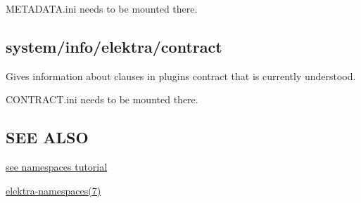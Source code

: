 {\ttfamily M\+E\+T\+A\+D\+A\+T\+A.\+ini} needs to be mounted there.\hypertarget{doc_help_elektra-hierarchy_md_autotoc_md1703}{}\subsection{system/info/elektra/contract}\label{doc_help_elektra-hierarchy_md_autotoc_md1703}
Gives information about clauses in plugin\textquotesingle{}s contract that is currently understood.

{\ttfamily C\+O\+N\+T\+R\+A\+C\+T.\+ini} needs to be mounted there.\hypertarget{doc_help_elektra-hierarchy_md_autotoc_md1704}{}\subsection{S\+E\+E A\+L\+SO}\label{doc_help_elektra-hierarchy_md_autotoc_md1704}

\begin{DoxyItemize}
\item \hyperlink{doc_tutorials_namespaces_md}{see namespaces tutorial}
\item \hyperlink{doc_help_elektra-namespaces_md}{elektra-\/namespaces(7)} 
\end{DoxyItemize}